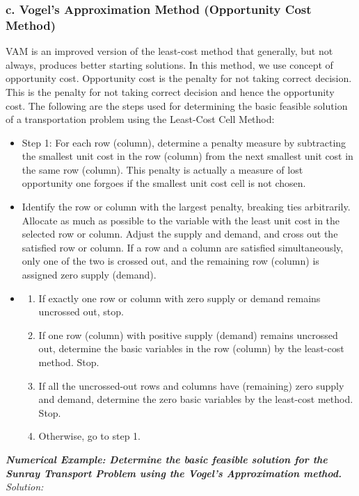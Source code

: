 \subsubsection{c. Vogel's Approximation Method (Opportunity Cost Method)}
VAM is an improved version of the least-cost method that generally, but not always, produces better starting solutions. In this method, we use concept of opportunity cost. Opportunity cost is the penalty for not taking correct decision. This is the penalty for not taking correct decision and hence the opportunity cost.
The following are the steps used for determining the basic feasible solution of a transportation problem using the Least-Cost Cell Method:
\begin{itemize}
	\item Step 1: For each row (column), determine a penalty measure by subtracting the smallest unit cost in the row (column) from the next smallest unit cost in the same row (column). This penalty is actually a measure of lost opportunity one forgoes if the smallest unit cost cell is not chosen.
	\item Identify the row or column with the largest penalty, breaking ties arbitrarily. Allocate as much as possible to the variable with the least unit cost in the selected row or column. Adjust the supply and demand, and cross out the satisfied row or column. If a row and a column are satisfied simultaneously, only one of the two is crossed out, and the remaining row (column) is assigned zero supply (demand).
	\item \begin{enumerate}
		\item If exactly one row or column with zero supply or demand remains uncrossed out, stop.
		\item If one row (column) with positive supply (demand) remains uncrossed out, determine the basic variables in the row (column) by the least-cost method. Stop.
		\item If all the uncrossed-out rows and columns have (remaining) zero supply and demand, determine the zero basic variables by the least-cost method. Stop.
		\item Otherwise, go to step 1.
	\end{enumerate}
\end{itemize}
\textbf{\textit{Numerical Example: Determine the basic feasible solution for the Sunray Transport Problem using the Vogel's Approximation method.}}\\
\textit{Solution:}\\
